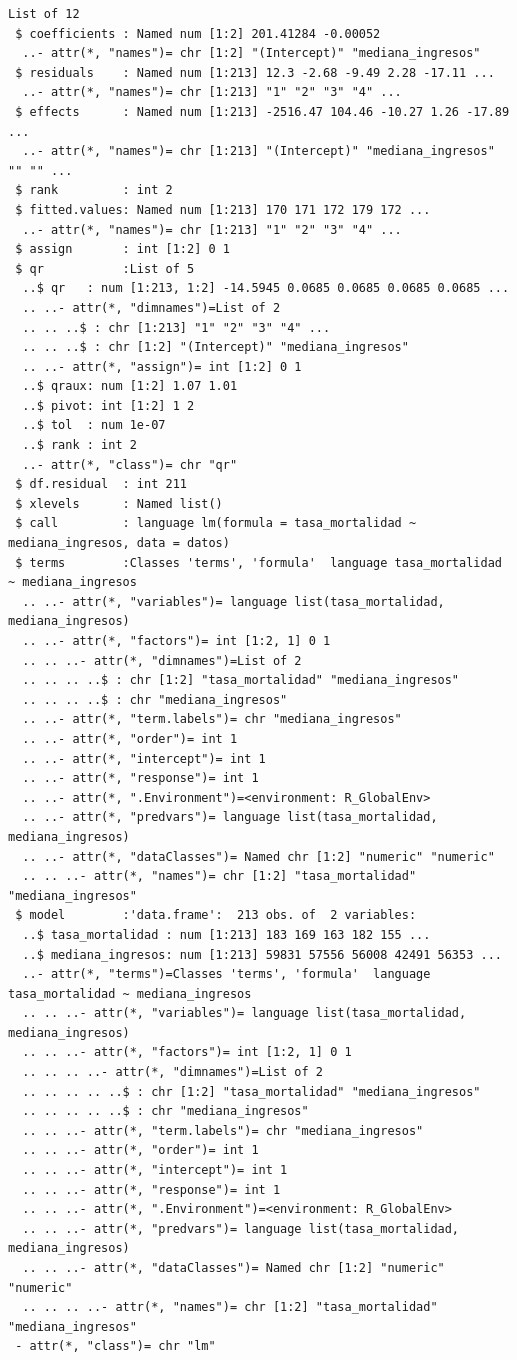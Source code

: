 \documentclass[
  spanish,
  a4paper,
]{scrbook}
\begin{document}
\begin{verbatim}
List of 12
 $ coefficients : Named num [1:2] 201.41284 -0.00052
  ..- attr(*, "names")= chr [1:2] "(Intercept)" "mediana_ingresos"
 $ residuals    : Named num [1:213] 12.3 -2.68 -9.49 2.28 -17.11 ...
  ..- attr(*, "names")= chr [1:213] "1" "2" "3" "4" ...
 $ effects      : Named num [1:213] -2516.47 104.46 -10.27 1.26 -17.89 ...
  ..- attr(*, "names")= chr [1:213] "(Intercept)" "mediana_ingresos" "" "" ...
 $ rank         : int 2
 $ fitted.values: Named num [1:213] 170 171 172 179 172 ...
  ..- attr(*, "names")= chr [1:213] "1" "2" "3" "4" ...
 $ assign       : int [1:2] 0 1
 $ qr           :List of 5
  ..$ qr   : num [1:213, 1:2] -14.5945 0.0685 0.0685 0.0685 0.0685 ...
  .. ..- attr(*, "dimnames")=List of 2
  .. .. ..$ : chr [1:213] "1" "2" "3" "4" ...
  .. .. ..$ : chr [1:2] "(Intercept)" "mediana_ingresos"
  .. ..- attr(*, "assign")= int [1:2] 0 1
  ..$ qraux: num [1:2] 1.07 1.01
  ..$ pivot: int [1:2] 1 2
  ..$ tol  : num 1e-07
  ..$ rank : int 2
  ..- attr(*, "class")= chr "qr"
 $ df.residual  : int 211
 $ xlevels      : Named list()
 $ call         : language lm(formula = tasa_mortalidad ~ mediana_ingresos, data = datos)
 $ terms        :Classes 'terms', 'formula'  language tasa_mortalidad ~ mediana_ingresos
  .. ..- attr(*, "variables")= language list(tasa_mortalidad, mediana_ingresos)
  .. ..- attr(*, "factors")= int [1:2, 1] 0 1
  .. .. ..- attr(*, "dimnames")=List of 2
  .. .. .. ..$ : chr [1:2] "tasa_mortalidad" "mediana_ingresos"
  .. .. .. ..$ : chr "mediana_ingresos"
  .. ..- attr(*, "term.labels")= chr "mediana_ingresos"
  .. ..- attr(*, "order")= int 1
  .. ..- attr(*, "intercept")= int 1
  .. ..- attr(*, "response")= int 1
  .. ..- attr(*, ".Environment")=<environment: R_GlobalEnv> 
  .. ..- attr(*, "predvars")= language list(tasa_mortalidad, mediana_ingresos)
  .. ..- attr(*, "dataClasses")= Named chr [1:2] "numeric" "numeric"
  .. .. ..- attr(*, "names")= chr [1:2] "tasa_mortalidad" "mediana_ingresos"
 $ model        :'data.frame':  213 obs. of  2 variables:
  ..$ tasa_mortalidad : num [1:213] 183 169 163 182 155 ...
  ..$ mediana_ingresos: num [1:213] 59831 57556 56008 42491 56353 ...
  ..- attr(*, "terms")=Classes 'terms', 'formula'  language tasa_mortalidad ~ mediana_ingresos
  .. .. ..- attr(*, "variables")= language list(tasa_mortalidad, mediana_ingresos)
  .. .. ..- attr(*, "factors")= int [1:2, 1] 0 1
  .. .. .. ..- attr(*, "dimnames")=List of 2
  .. .. .. .. ..$ : chr [1:2] "tasa_mortalidad" "mediana_ingresos"
  .. .. .. .. ..$ : chr "mediana_ingresos"
  .. .. ..- attr(*, "term.labels")= chr "mediana_ingresos"
  .. .. ..- attr(*, "order")= int 1
  .. .. ..- attr(*, "intercept")= int 1
  .. .. ..- attr(*, "response")= int 1
  .. .. ..- attr(*, ".Environment")=<environment: R_GlobalEnv> 
  .. .. ..- attr(*, "predvars")= language list(tasa_mortalidad, mediana_ingresos)
  .. .. ..- attr(*, "dataClasses")= Named chr [1:2] "numeric" "numeric"
  .. .. .. ..- attr(*, "names")= chr [1:2] "tasa_mortalidad" "mediana_ingresos"
 - attr(*, "class")= chr "lm"
\end{verbatim}
\end{document}

